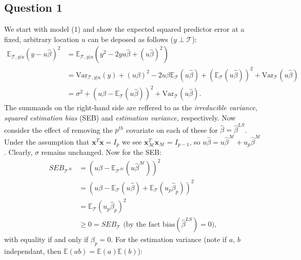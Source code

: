 \documentclass{article}
\begin{document}
\subsection{Question 1}
We start with model (1) and show the expected squared predictor error at a fixed, arbitrary location $u$ can be deposed as follows ($y \perp \mathcal{T}$):
\begin{equation*}
\begin{split}
\mathbb{E}_{\mathcal{T},y|u}(y-u\hat{\beta})^2 &= \mathbb{E}_{\mathcal{T},y|u} (y^2-2yu\hat{\beta}+(u\hat{\beta})^2) \\
&=\text{Var}_{\mathcal{T},y|u}(y)+(u\beta)^2-2 u\beta \mathbb{E}_{\mathcal{T}}(u\hat{\beta})+(\mathbb{E}_{\mathcal{T}}(u\hat{\beta}))^2+\text{Var}_{\mathcal{T}}(u\hat{\beta}) \\
&= \sigma ^2 +(u\beta - \mathbb{E}_{\mathcal{T}}(u\hat{\beta}))^2 + \text{Var}_{\mathcal{T}}(u\hat{\beta}).
\end{split}
\end{equation*}
The summands on the right-hand side are reffered to as the \textit{irreducible variance}, \textit{squared estimation bias} (SEB) and \textit{estimation variance}, respectively. Now consider the effect of removing the $p^{th}$ covariate on each of these for $\hat{\beta}=\hat{\beta}^{LS}$. Under the assumption that $\textbf{x}^T\textbf{x}=I_p$ we see $\textbf{x}_{\mathcal{M}}^T \textbf{x}_{\mathcal{M}}=I_{p-1}$, so $u\hat{\beta}=u\hat{\beta}^{\mathcal{M}}+u_p\hat{\beta}^{\mathcal{M}}$. Clearly, $\sigma$ remains unchanged. Now for the SEB:
\begin{equation*}
\begin{split}
SEB_{\mathcal{T}^{\mathcal{M}}} &= (u\beta -\mathbb{E}_{\mathcal{T}^\mathcal{M}}(u\hat{\beta}^{\mathcal{M}}))^2 \\
&= (u\beta -\mathbb{E}_{\mathcal{T}}(u\hat{\beta})+\mathbb{E}_{\mathcal{T}}(u_p \hat{\beta}_p))^2 \\
&= \mathbb{E}_{\mathcal{T}}(u_p\hat{\beta}_p)^2 \\
&\geq 0 = SEB_{\mathcal{T}} \text{ (by the fact } \text{bias}(\hat{\beta}^{LS})=0),
\end{split}
\end{equation*}
with equality if and only if $\beta_p=0$. For the estimation variance (note if $a$, $b$ independant, then $\mathbb{E}(ab)=\mathbb{E}(a)\mathbb{E}(b)$):
\end{document}
